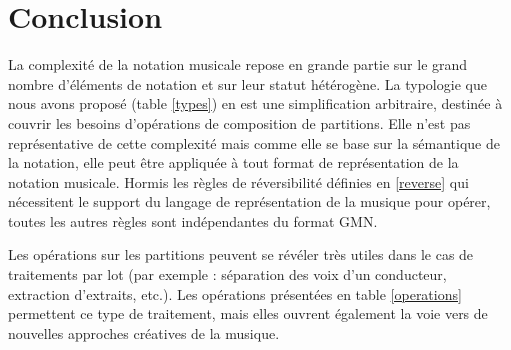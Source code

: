 \documentclass{article}
\begin{document}
\section{Conclusion}

La complexité de la notation musicale repose en grande partie sur le grand nombre d'éléments de notation et sur leur statut hétérogène. La typologie que nous avons proposé (table \ref{types}) en est une simplification arbitraire, destinée à couvrir les besoins d'opérations de composition de partitions. Elle n'est  pas représentative de cette complexité mais comme elle se base sur la sémantique de la notation, elle peut être appliquée à tout format de représentation de la notation musicale.
Hormis les règles de réversibilité définies en \ref{reverse} qui nécessitent le support du langage de représentation de la musique pour opérer, toutes les autres règles sont indépendantes du format GMN.

Les opérations sur les partitions peuvent se révéler très utiles dans le cas de traitements par lot (par exemple : séparation des voix d'un conducteur, extraction d'extraits, etc.).  Les opérations présentées en table \ref{operations} permettent ce type de traitement, mais elles ouvrent également la voie vers de nouvelles approches créatives de la musique.



\end{document}
